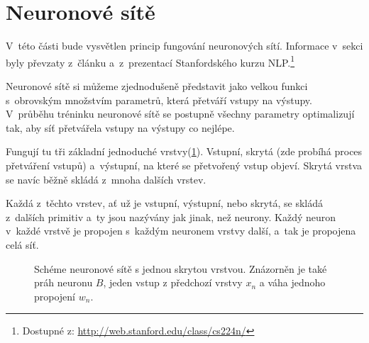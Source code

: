 \section{Neuronové sítě}
\label{neuronove_site}
V~této části bude vysvětlen princip fungování neuronových sítí. Informace v~sekci byly převzaty z~článku \cite{neural_nets} a~z~prezentací Stanfordského kurzu NLP.\footnote{Dostupné z: \url{http://web.stanford.edu/class/cs224n/}}\par
Neuronové sítě si můžeme zjednodušeně představit jako velkou funkci s~obrovským množstvím parametrů, která přetváří vstupy na výstupy. V~průběhu tréninku neuronové sítě se postupně všechny parametry optimalizují tak, aby síť přetvářela vstupy na výstupy co nejlépe.\par
Fungují tu tři základní jednoduché vrstvy(\ref{three_layers}). Vstupní, skrytá (zde probíhá proces přetváření vstupů) a~výstupní, na které se přetvořený vstup objeví. Skrytá vrstva se navíc běžně skládá z~mnoha dalších vrstev.\par
Každá z~těchto vrstev, ať už je vstupní, výstupní, nebo skrytá, se skládá z~dalších primitiv a~ty jsou nazývány jak jinak, než neurony. Každý neuron v~každé vrstvě je propojen s~každým neuronem vrstvy další, a~tak je propojena celá síť.

\begin{figure}[hbt]
	\centering
	\caption{Schéme neuronové sítě s jednou skrytou vrstvou. Znázorněn je také práh neuronu $B$, jeden vstup z předchozí vrstvy $x_n$ a váha jednoho propojení $w_n$.}
	\label{three_layers}
\end{figure}

